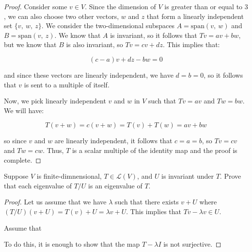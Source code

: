 \documentclass[10pt, oneside]{article}
\newenvironment{problem}[2][Problem]{\begin{trivlist}
\item[\hskip \labelsep {\bfseries #1}\hskip \labelsep {\bfseries #2.}]}{\end{trivlist}}
\begin{document}
    \begin{proof}

      Consider some $v \in V$. Since the dimension of $V$ is greater than or equal to $3$, we can also choose
      two other vectors, $w$ and $z$ that form a linearly independent set $\{v, \ w, \ z\}$.
      We consider the two-dimensional subspaces $A = \text{span}(v, \ w)$ and $B = \text{span}(v, \ z)$. We know that
      $A$ is invariant, so it follows that $Tv = av + bw$, but we know that $B$ is also invariant, so $Tv = cv + dz$. This implies that:

      $$(c - a)v + dz - bw = 0$$

      and since these vectors are linearly independent, we have $d = b = 0$, so it follows that $v$ is sent to a multiple of itself.
      \newline

      Now, we pick linearly independent $v$ and $w$ in $V$ such that $T v = a v$ and $T w = b w$. We will have:

      $$T(v + w) = c(v + w) = T(v) + T(w) = av + bw$$

      so since $v$ and $w$ are linearly independent, it follows that $c = a = b$, so $Tv = cv$ and $Tw = cw$. Thus, $T$ is a scalar multiple of the
      identity map and the proof is complete.

    \end{proof}

    \begin{problem}{5.35}
      Suppose $V$ is finite-dimnensional, $T \in \mathcal{L}(V)$, and $U$ is invariant under $T$. Prove that each eigenvalue of $T/U$ is an eigenvalue of $T$.
    \end{problem}

    \begin{proof}
      Let us assume that we have $\lambda$ such that there exists $v + U$ where $(T/U)(v + U) = T(v) + U = \lambda v + U$. This
      implies that $Tv - \lambda v \in U$.
      \newline

      Assume that 

      To do this, it is enough to show that the map $T - \lambda I$ is not surjective.
    \end{proof}

    
\end{document}
